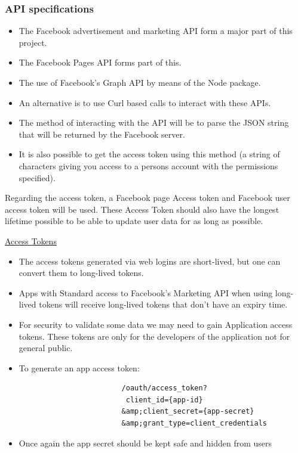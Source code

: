\documentclass{article}
\begin{document}
		\subsubsection{API specifications}
		\begin{itemize}
		
		
			\item The Facebook advertisement and marketing API form a major part of this project.
			
			\item The Facebook Pages API forms part of this.
			\item The use of Facebook's Graph API by means of the Node package.
			\item An alternative is to use Curl based calls to interact with these APIs.
			\item The method of interacting with the API will be to parse the JSON string that will be returned by the Facebook server.
			\item It is also possible to get the access token using this method (a string of characters giving you access to a persons  account with the permissions specified).
		\end{itemize}
			Regarding the access token, a Facebook page Access token and Facebook user access token will be used. These Access Token should also have the longest lifetime possible to be able to update user data for as long as possible.

			\href{https://developers..com/docs/-login/access-tokens}{Access Tokens}
			\begin{itemize}
				\item The access tokens generated via web logins are short-lived, but one can convert them to long-lived tokens.
				\item Apps with Standard access to Facebook's Marketing API when using long-lived tokens will receive long-lived tokens that don't have an expiry time.
				\item For security to validate some data we may need to gain Application access tokens. These tokens are only for the developers of the application not for general public.
				\item To generate an app access token:
					\begin{verbatim}
						/oauth/access_token?
					     client_id={app-id}
					    &amp;client_secret={app-secret}
					    &amp;grant_type=client_credentials
					\end{verbatim}
				\item Once again the app secret should be kept safe and hidden from users
			\end{itemize}
\end{document}
